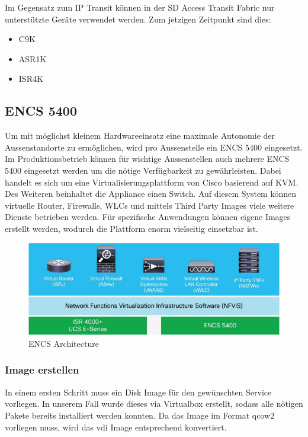 Im Gegensatz zum IP Transit können in der SD Access Transit Fabric nur unterstützte Geräte verwendet werden. Zum jetzigen Zeitpunkt sind dies:

\begin{itemize}
	\item C9K
	\item ASR1K
	\item ISR4K 
\end{itemize}

\subsection{ENCS 5400}

Um mit möglichst kleinem Hardwareeinsatz eine maximale Autonomie der Aussenstandorte zu ermöglichen, wird pro Aussenstelle ein ENCS 5400 eingesetzt. Im Produktionsbetrieb können für wichtige Aussenstellen auch mehrere ENCS 5400 eingesetzt werden um die nötige Verfügbarkeit zu gewährleisten.
Dabei handelt es sich um eine Virtualisierungsplattform von Cisco basierend auf KVM. Des Weiteren beinhaltet die Appliance einen Switch. 
Auf diesem System können virtuelle Router, Firewalls, WLCs und mittels Third Party Images viele weitere Dienste betrieben werden. Für spezifische Anwendungen können eigene Images erstellt werden, wodurch die Plattform enorm vielseitig einsetzbar ist.

\begin{figure}[H]
	\centering
	\includegraphics[width=0.6\linewidth]{img/Absicherung/ENCS_Architecture.png}
	\caption{ENCS Architecture \cite{enterprise-network-functions-virtualization-faq} }
	\label{fig:ENCS Architecture}
\end{figure}

\subsubsection{Image erstellen}

In einem ersten Schritt muss ein Disk Image für den gewünschten Service vorliegen. In unserem Fall wurde dieses via Virtualbox erstellt, sodass alle nötigen Pakete bereits installiert werden konnten. Da das Image im Format qcow2 vorliegen muss, wird das vdi Image entsprechend konvertiert.

